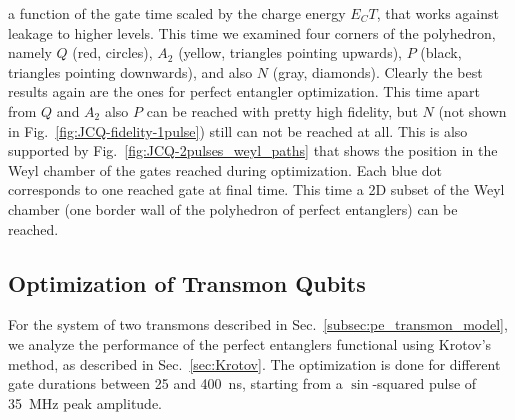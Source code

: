 a function of the gate time scaled by the charge energy $E_C T$, that works
against leakage to higher levels.
This time we examined four corners of the polyhedron, namely $Q$ (red, circles),
$A_2$ (yellow, triangles pointing upwards), $P$ (black, triangles pointing
downwards), and also $N$ (gray, diamonds). Clearly the best results again are
the ones for perfect entangler optimization. This time apart from $Q$ and $A_2$
also $P$ can be reached with pretty high fidelity, but $N$ (not shown in
Fig.~\ref{fig:JCQ-fidelity-1pulse}) still can not be reached at all. This is
also supported by Fig.~\ref{fig:JCQ-2pulses_weyl_paths} that shows the position in
the Weyl chamber of the gates reached during optimization. Each blue dot
corresponds to one reached gate at final time. This time a 2D subset of the Weyl
chamber (one border wall of the polyhedron of perfect entanglers) can be
reached.


\subsection{Optimization of Transmon Qubits}
\label{subsec:SC}

For the system of two transmons described in Sec.~\ref{subsec:pe_transmon_model},
we analyze the performance of the perfect entanglers functional using Krotov's
method, as described in Sec.~\ref{sec:Krotov}. The optimization is done for
different gate durations between 25 and 400~ns, starting from a $\sin$-squared
pulse of 35~MHz peak amplitude.

